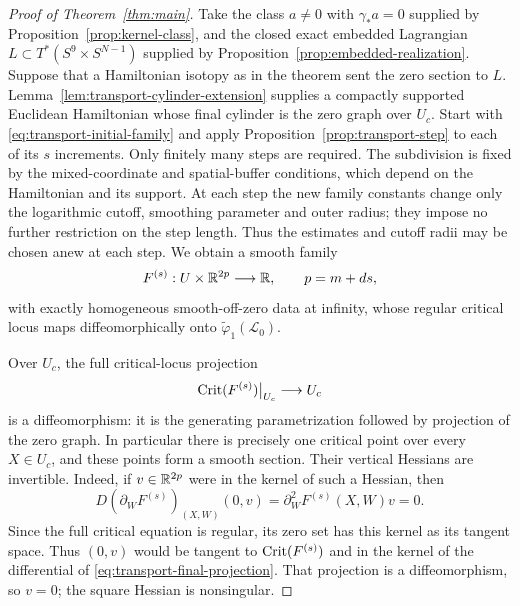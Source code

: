 \begin{proof}[Proof of Theorem~\ref{thm:main}]
Take the class $a\ne0$ with $\gamma_*a=0$ supplied by
Proposition~\ref{prop:kernel-class}, and the closed exact embedded
Lagrangian $L\subset T^*(S^9\times S^{N-1})$ supplied by
Proposition~\ref{prop:embedded-realization}.  Suppose that a
Hamiltonian isotopy as in the theorem sent the zero section to $L$.
Lemma~\ref{lem:transport-cylinder-extension} supplies a compactly
supported Euclidean Hamiltonian whose final cylinder is the zero
graph over $U_c$.  Start with
\eqref{eq:transport-initial-family} and apply
Proposition~\ref{prop:transport-step} to each of its $s$ increments.
Only finitely many steps are required. The subdivision is fixed by the
mixed-coordinate and spatial-buffer conditions, which depend on the
Hamiltonian and its support. At each step the new family constants
change only the logarithmic cutoff, smoothing parameter and outer
radius; they impose no further restriction on the step length.
Thus the estimates and cutoff radii may be chosen anew at each step.
We obtain a smooth family
\[
 F^{(s)}:U\times\mathbb R^{2p}\longrightarrow\mathbb R,
 \qquad p=m+ds,
\]
with exactly homogeneous smooth-off-zero data at infinity, whose
regular critical locus maps diffeomorphically onto
$\widetilde\varphi_1(\mathcal L_0)$.

Over $U_c$, the full critical-locus projection
\begin{equation}
 \operatorname{Crit}(F^{(s)})\big|_{U_c}\longrightarrow U_c
 \label{eq:transport-final-projection}
\end{equation}
is a diffeomorphism: it is the generating parametrization followed
by projection of the zero graph.  In particular there is precisely
one critical point over every $X\in U_c$, and these points form a
smooth section.  Their vertical Hessians are invertible.  Indeed,
if $v\in\mathbb R^{2p}$ were in the kernel of such a Hessian, then
\[
 D(\partial_WF^{(s)})_{(X,W)}(0,v)
   =\partial_W^2F^{(s)}(X,W)v=0.
\]
Since the full critical equation is regular, its zero set has this
kernel as its tangent space.  Thus $(0,v)$ would be tangent to
$\operatorname{Crit}(F^{(s)})$ and in the kernel of the differential of
\eqref{eq:transport-final-projection}.  That projection is a
diffeomorphism, so $v=0$; the square Hessian is nonsingular.


\end{proof}
